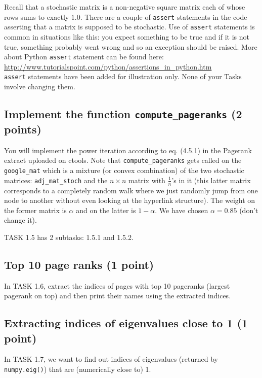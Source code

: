 \documentclass{article}
\begin{document}
Recall that a stochastic matrix is a non-negative square matrix each of whose rows sums to exactly $1.0$. There are a couple of {\tt assert} statements in the code asserting that
a matrix is supposed to be stochastic. Use of {\tt assert} statements is common in situations like this: you expect something to be true and if it is not true, something probably went wrong
and so an exception should be raised. More about Python {\tt assert} statement can be found here:\\
\url{http://www.tutorialspoint.com/python/assertions_in_python.htm}\\
{\tt assert} statements have been added for illustration only. None of your Tasks involve changing them.

\subsection{Implement the function {\tt compute\_pageranks} (2 points)}

You will implement the power iteration according to eq. (4.5.1) in the Pagerank extract uploaded on ctools. Note that {\tt compute\_pageranks} gets called on the {\tt google\_mat}
which is a mixture (or convex combination) of the two stochastic matrices: {\tt adj\_mat\_stoch} and the $n \times n$ matrix with $\frac{1}{n}$'s in it (this latter matrix
corresponds to a completely random walk where we just randomly jump from one node to another without even looking at the hyperlink structure). The weight
on the former matrix is $\alpha$ and on the latter is $1-\alpha$. We have chosen $\alpha = 0.85$ (don't change it).

TASK 1.5 has 2 subtasks: 1.5.1 and 1.5.2.

\subsection{Top 10 page ranks (1 point)}

In TASK 1.6, extract the indices of pages with top 10 pageranks (largest pagerank on top) and then print their names using the extracted indices.

\subsection{Extracting indices of eigenvalues close to 1 (1 point)}

In TASK 1.7, we want to find out indices of eigenvalues (returned by {\tt numpy.eig()}) that are (numerically close to) 1.
\end{document}
